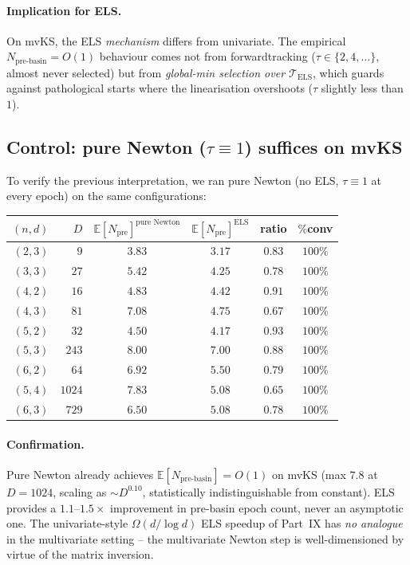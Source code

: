 \documentclass[11pt,a4paper]{article}
\begin{document}
\paragraph{Implication for ELS.}
On mvKS, the ELS \emph{mechanism} differs from univariate. The empirical $N_{\text{pre-basin}} = O(1)$ behaviour comes not from forwardtracking ($\tau \in \{2, 4, \dots\}$, almost never selected) but from \emph{global-min selection over $\mathcal T_{\text{ELS}}$}, which guards against pathological starts where the linearisation overshoots ($\tau$ slightly less than $1$).

\subsection{Control: pure Newton ($\tau \equiv 1$) suffices on mvKS}

To verify the previous interpretation, we ran pure Newton (no ELS, $\tau \equiv 1$ at every epoch) on the same configurations:

\begin{center}
\begin{tabular}{rrcccc}
\toprule
$(n, d)$ & $D$ & $\mathbb{E}[N_{\text{pre}}]^{\text{pure Newton}}$ & $\mathbb{E}[N_{\text{pre}}]^{\text{ELS}}$ & ratio & $\%$conv \\
\midrule
$(2, 3)$ & $9$    & $3.83$ & $3.17$ & $0.83$ & $100\%$ \\
$(3, 3)$ & $27$   & $5.42$ & $4.25$ & $0.78$ & $100\%$ \\
$(4, 2)$ & $16$   & $4.83$ & $4.42$ & $0.91$ & $100\%$ \\
$(4, 3)$ & $81$   & $7.08$ & $4.75$ & $0.67$ & $100\%$ \\
$(5, 2)$ & $32$   & $4.50$ & $4.17$ & $0.93$ & $100\%$ \\
$(5, 3)$ & $243$  & $8.00$ & $7.00$ & $0.88$ & $100\%$ \\
$(6, 2)$ & $64$   & $6.92$ & $5.50$ & $0.79$ & $100\%$ \\
$(5, 4)$ & $1024$ & $7.83$ & $5.08$ & $0.65$ & $100\%$ \\
$(6, 3)$ & $729$  & $6.50$ & $5.08$ & $0.78$ & $100\%$ \\
\bottomrule
\end{tabular}
\end{center}

\paragraph{Confirmation.}
Pure Newton already achieves $\mathbb{E}[N_{\text{pre-basin}}] = O(1)$ on mvKS (max $7.8$ at $D = 1024$, scaling as $\sim D^{0.10}$, statistically indistinguishable from constant). ELS provides a $1.1$--$1.5\times$ improvement in pre-basin epoch count, never an asymptotic one. The univariate-style $\Omega(d/\log d)$ ELS speedup of Part~IX has \emph{no analogue} in the multivariate setting -- the multivariate Newton step is well-dimensioned by virtue of the matrix inversion.
\end{document}
